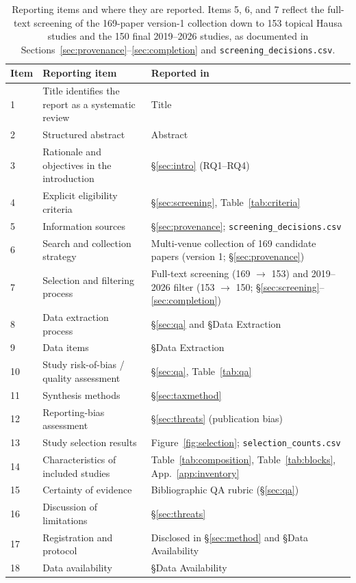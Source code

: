 \documentclass[sn-basic,pdflatex]{sn-jnl}
\begin{document}
\begin{table}[!htb]\centering\small
\caption{Reporting items and where they are reported. Items 5, 6, and 7 reflect the full-text screening of the 169-paper version-1 collection down to 153 topical Hausa studies and the 150 final 2019--2026 studies, as documented in Sections~\ref{sec:provenance}--\ref{sec:completion} and \texttt{screening\_decisions.csv}.}
\begin{tabular}{@{}p{}p{}p{}@{}}
\toprule
\textbf{Item} & \textbf{Reporting item} & \textbf{Reported in} \\
\midrule
1 & Title identifies the report as a systematic review & Title \\
2 & Structured abstract & Abstract \\
3 & Rationale and objectives in the introduction & \S\ref{sec:intro} (RQ1--RQ4) \\
4 & Explicit eligibility criteria & \S\ref{sec:screening}, Table~\ref{tab:criteria} \\
5 & Information sources & \S\ref{sec:provenance}; \texttt{screening\_decisions.csv} \\
6 & Search and collection strategy & Multi-venue collection of 169 candidate papers (version 1; \S\ref{sec:provenance}) \\
7 & Selection and filtering process & Full-text screening (169 $\to$ 153) and 2019--2026 filter (153 $\to$ 150; \S\ref{sec:screening}--\ref{sec:completion}) \\
8 & Data extraction process & \S\ref{sec:qa} and \S Data Extraction \\
9 & Data items & \S Data Extraction \\
10 & Study risk-of-bias / quality assessment & \S\ref{sec:qa}, Table~\ref{tab:qa} \\
11 & Synthesis methods & \S\ref{sec:taxmethod} \\
12 & Reporting-bias assessment & \S\ref{sec:threats} (publication bias) \\
13 & Study selection results & Figure~\ref{fig:selection}; \texttt{selection\_counts.csv} \\
14 & Characteristics of included studies & Table~\ref{tab:composition}, Table~\ref{tab:blocks}, App.~\ref{app:inventory} \\
15 & Certainty of evidence & Bibliographic QA rubric (\S\ref{sec:qa}) \\
16 & Discussion of limitations & \S\ref{sec:threats} \\
17 & Registration and protocol & Disclosed in \S\ref{sec:method} and \S Data Availability \\
18 & Data availability & \S Data Availability \\
\bottomrule
\end{tabular}
\end{table}
\end{document}
